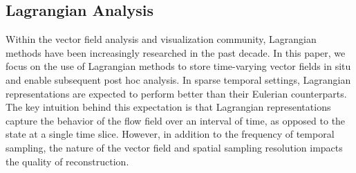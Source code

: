 \setlength{\belowdisplayskip}{3pt} \setlength{\belowdisplayshortskip}{3pt}
\setlength{\abovedisplayskip}{3pt} \setlength{\abovedisplayshortskip}{3pt}


\vspace{-1mm}
\subsection{Lagrangian Analysis}
Within the vector field analysis and visualization community, Lagrangian methods have been increasingly researched in the past decade. 
%
In this paper, we focus on the use of Lagrangian methods to store time-varying vector fields in situ and enable subsequent post hoc analysis.
%
%
In sparse temporal settings, Lagrangian representations are expected to perform better than their Eulerian counterparts. 
%
The key intuition behind this expectation is that Lagrangian representations capture the behavior of the flow field over an interval of time, as opposed to the state at a single time slice.
%
However, in addition to the frequency of temporal sampling, the nature of the vector field and spatial sampling resolution impacts the quality of reconstruction.
%


